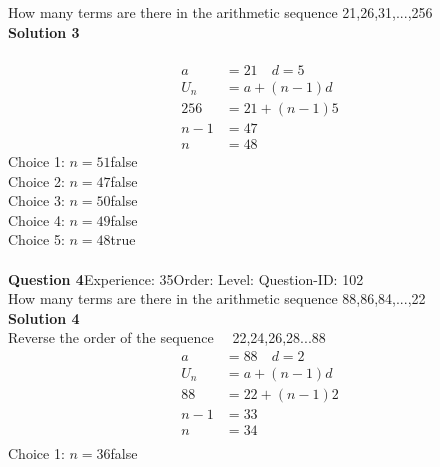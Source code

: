 \documentclass{article}
\begin{document}
How many terms are there in the arithmetic sequence 21,26,31,...,256\\[4pt]
\noindent\textbf{Solution 3}\\[2pt]
\\[-35pt]\begin{align*}
a&=21 \quad d=5\\[2pt]
U_n&=a+(n-1)d\\[2pt]
256&=21+(n-1)5\\[2pt]
n-1&=47\\[2pt]
n&=48
\end{align*}
Choice 1: \hspace{20pt}$n=51$\hspace{20pt}false\\
Choice 2: \hspace{20pt}$n=47$\hspace{20pt}false\\
Choice 3: \hspace{20pt}$n=50$\hspace{20pt}false\\
Choice 4: \hspace{20pt}$n=49$\hspace{20pt}false\\
Choice 5: \hspace{20pt}$n=48$\hspace{20pt}true\\
\\[4pt]
\noindent\textbf{Question 4}\hspace{20pt}Experience: 35\hspace{20pt}Order: \hspace{20pt}Level: \hspace{20pt}Question-ID: 102\\[2pt]
How many terms are there in the arithmetic sequence 88,86,84,...,22\\[4pt]
\noindent\textbf{Solution 4}\\[2pt]
Reverse the order of the sequence$\quad$ 22,24,26,28...88
\begin{align*}
a&=88 \quad d=2\\[2pt]
U_n&=a+(n-1)d\\[2pt]
88&=22+(n-1)2\\[2pt]
n-1&=33\\[2pt]
n&=34\\[-100pt]
\end{align*}
Choice 1: \hspace{20pt}$n=36$\hspace{20pt}false\\
\end{document}
